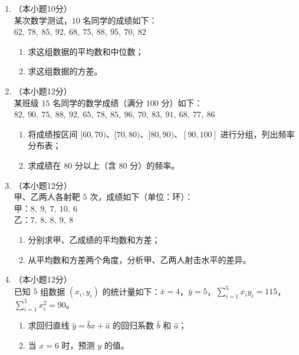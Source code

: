 \documentclass[12pt, a4paper]{ctexart}
\begin{document}
\begin{enumerate}[resume]
\item[17.]（本小题10分）\\
某次数学测试，$10$ 名同学的成绩如下：\\
$62,\ 78,\ 85,\ 92,\ 68,\ 75,\ 88,\ 95,\ 70,\ 82$
\begin{enumerate}[(1)]
  \item 求这组数据的平均数和中位数；
  \item 求这组数据的方差。
\end{enumerate}

\vspace{6cm}

\item[18.]（本小题12分）\\
某班级 $15$ 名同学的数学成绩（满分 $100$ 分）如下：\\
$82,\ 90,\ 75,\ 88,\ 92,\ 65,\ 78,\ 85,\ 96,\ 70,\ 83,\ 91,\ 68,\ 77,\ 86$
\begin{enumerate}[(1)]
  \item 将成绩按区间 $[60,70)$、$[70,80)$、$[80,90)$、$[90,100]$ 进行分组，列出频率分布表；
  \item 求成绩在 $80$ 分以上（含 $80$ 分）的频率。
\end{enumerate}

\vspace{6cm}

\item[19.]（本小题12分）\\
甲、乙两人各射靶 $5$ 次，成绩如下（单位：环）：\\
甲：$8,\ 9,\ 7,\ 10,\ 6$\\
乙：$7,\ 8,\ 8,\ 9,\ 8$
\begin{enumerate}[(1)]
  \item 分别求甲、乙成绩的平均数和方差；
  \item 从平均数和方差两个角度，分析甲、乙两人射击水平的差异。
\end{enumerate}

\vspace{6cm}

\item[20.]（本小题12分）\\
已知 $5$ 组数据 $(x_i,y_i)$ 的统计量如下：$\bar{x}=4$，$\bar{y}=5$，$\displaystyle\sum_{i=1}^{5}x_iy_i=115$，$\displaystyle\sum_{i=1}^{5}x_i^2=90$。
\begin{enumerate}[(1)]
  \item 求回归直线 $\hat{y}=\hat{b}x+\hat{a}$ 的回归系数 $\hat{b}$ 和 $\hat{a}$；
  \item 当 $x=6$ 时，预测 $y$ 的值。
\end{enumerate}


\end{enumerate}
\end{document}

